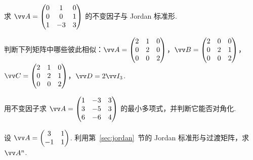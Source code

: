 {\begin{exA}
			\item\label{ex:lam:A7} 求 $\vv A=\begin{pmatrix}0&1&0\\0&0&1\\1&-3&3\end{pmatrix}$ 的不变因子与 Jordan 标准形.
			\item\label{ex:lam:A8} 判断下列矩阵中哪些彼此相似：$\vv A=\begin{pmatrix}2&1&0\\0&2&0\\0&0&2\end{pmatrix}$，$\vv B=\begin{pmatrix}2&0&0\\0&2&1\\0&0&2\end{pmatrix}$，$\vv C=\begin{pmatrix}2&1&0\\0&2&1\\0&0&2\end{pmatrix}$，$\vv D=2\vv I_3$.
			\item\label{ex:lam:A9} 用不变因子求 $\vv A=\begin{pmatrix}1&-3&3\\3&-5&3\\6&-6&4\end{pmatrix}$ 的最小多项式，并判断它能否对角化.
			\item\label{ex:lam:A10} 设 $\vv A=\begin{pmatrix}3&1\\-1&1\end{pmatrix}$. 利用第~\ref{sec:jordan}~节的 Jordan 标准形与过渡矩阵，求 $\vv A^n$.
		\end{exA}
		
}
